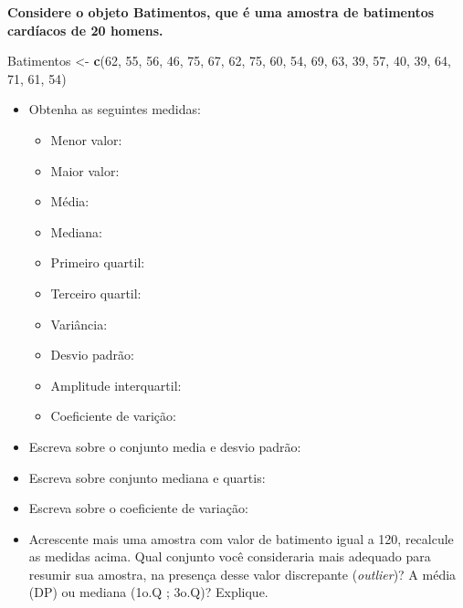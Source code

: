 \documentclass[
]{book}
\newenvironment{Shaded}{\begin{snugshade}}{\end{snugshade}}
\newcommand{\DecValTok}[1]{\textcolor[rgb]{0.00,0.00,0.81}{#1}}
\newcommand{\FunctionTok}[1]{\textcolor[rgb]{0.13,0.29,0.53}{\textbf{#1}}}
\newcommand{\NormalTok}[1]{#1}
\newcommand{\OtherTok}[1]{\textcolor[rgb]{0.56,0.35,0.01}{#1}}
\providecommand{\tightlist}{%
  \setlength{\itemsep}{0pt}\setlength{\parskip}{0pt}}
\begin{document}
\textbf{Considere o objeto Batimentos, que é uma amostra de batimentos cardíacos de 20 homens.}

\begin{Shaded}
\begin{Highlighting}[]
\NormalTok{Batimentos }\OtherTok{\textless{}{-}} \FunctionTok{c}\NormalTok{(}\DecValTok{62}\NormalTok{, }\DecValTok{55}\NormalTok{, }\DecValTok{56}\NormalTok{, }\DecValTok{46}\NormalTok{, }\DecValTok{75}\NormalTok{, }\DecValTok{67}\NormalTok{, }\DecValTok{62}\NormalTok{, }\DecValTok{75}\NormalTok{, }\DecValTok{60}\NormalTok{, }\DecValTok{54}\NormalTok{, }\DecValTok{69}\NormalTok{, }\DecValTok{63}\NormalTok{, }\DecValTok{39}\NormalTok{, }\DecValTok{57}\NormalTok{, }\DecValTok{40}\NormalTok{, }\DecValTok{39}\NormalTok{, }\DecValTok{64}\NormalTok{, }\DecValTok{71}\NormalTok{, }\DecValTok{61}\NormalTok{, }\DecValTok{54}\NormalTok{)}
\end{Highlighting}
\end{Shaded}

\begin{itemize}
\item
  Obtenha as seguintes medidas:

  \begin{itemize}
  \tightlist
  \item
    Menor valor:
  \item
    Maior valor:
  \item
    Média:
  \item
    Mediana:
  \item
    Primeiro quartil:
  \item
    Terceiro quartil:
  \item
    Variância:
  \item
    Desvio padrão:
  \item
    Amplitude interquartil:
  \item
    Coeficiente de varição:
  \end{itemize}
\item
  Escreva sobre o conjunto media e desvio padrão:
\item
  Escreva sobre conjunto mediana e quartis:
\item
  Escreva sobre o coeficiente de variação:
\item
  Acrescente mais uma amostra com valor de batimento igual a 120, recalcule as medidas acima. Qual conjunto você consideraria mais adequado para resumir sua amostra, na presença desse valor discrepante (\emph{outlier})? A média (DP) ou mediana (1o.Q ; 3o.Q)? Explique.
\end{itemize}
\end{document}
